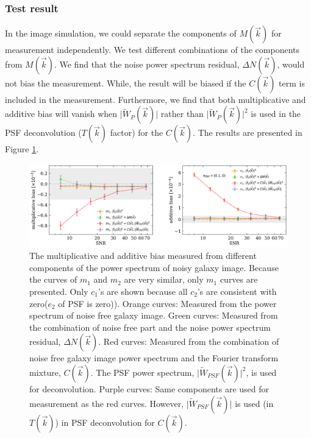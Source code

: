\documentclass[twocolumn]{aastex62}
\begin{document}
\subsubsection{Test result}

In the image simulation, we could separate the components of $M(\vec{k})$ for measurement independently. We test different combinations of the components from $M(\vec{k})$. We find that the noise power spectrum residual, $\Delta N(\vec{k})$, would not bias the measurement. While, the result will be biased if the $C(\vec{k})$ term is included in the measurement. Furthermore, we find that both multiplicative and additive bias will vanish when $\vert \widetilde{W}_{P}(\vec{k})\vert$ rather than $\vert \widetilde{W}_{P}(\vec{k})\vert^2$ is used in the PSF deconvolution ($T(\vec{k})$ factor) for the $C(\vec{k})$. The results are presented in Figure \ref{fig:pts_componets}.



\begin{figure}[htbp]
	\centering
	\includegraphics[width=0.9\linewidth]{figures/pts_sample_components.pdf}
	\caption{The multiplicative and additive bias measured from different components of the power spectrum of noisy galaxy image. Because the curves of $m_1$ and $m_2$ are very similar, only $m_1$ curves are presented. Only $c_1$'s are shown because all $c_2$'s are consistent with zero($e_{2}$ of PSF is zero)).  Orange curves: Measured from the power spectrum of noise free galaxy image. Green curves: Measured from the combination of noise free part and the noise power spectrum residual, $\Delta N(\vec{k})$. Red curves: Measured from the combination of noise free galaxy image power spectrum and the Fourier transform mixture, $C(\vec{k})$. The PSF power spectrum, $\vert \widetilde{W}_{PSF}(\vec{k})\vert^2$, is used for deconvolution. Purple curves: Same components are used for measurement as the red curves. However, $\vert \widetilde{W}_{PSF}(\vec{k})\vert$ is used (in $T(\vec{k})$) in PSF deconvolution for $C(\vec{k})$.}\label{fig:pts_componets}
\end{figure}
\end{document}
